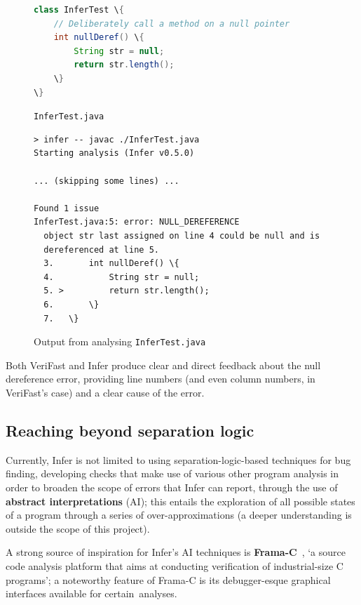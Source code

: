 \begin{figure}
    \centering
    \begin{lstlisting}[language=Java,
        style=code,
        xleftmargin=0.2\textwidth,
        xrightmargin=0.2\textwidth]
class InferTest \{
    // Deliberately call a method on a null pointer
    int nullDeref() \{
        String str = null;
        return str.length();
    \}
\}
    \end{lstlisting}
    \caption{\texttt{InferTest.java}}
    \label{fig:infer-example}
\end{figure}

\begin{figure}
    \centering
    \begin{lstlisting}[style=terminal,
        xleftmargin=0.05\textwidth,
        xrightmargin=0.05\textwidth]
> infer -- javac ./InferTest.java
Starting analysis (Infer v0.5.0)

... (skipping some lines) ...

Found 1 issue
InferTest.java:5: error: NULL_DEREFERENCE
  object str last assigned on line 4 could be null and is
  dereferenced at line 5.
  3.       int nullDeref() \{
  4.           String str = null;
  5. >         return str.length();
  6.       \}
  7.   \}
    \end{lstlisting}
    \caption{Output from analysing \texttt{InferTest.java}}
    \label{fig:infer-example-output}
\end{figure}

Both VeriFast and Infer produce clear and direct feedback about the null
dereference error, providing line numbers (and even column numbers, in
VeriFast's case) and a clear cause of the error.

\subsection{Reaching beyond separation logic}

Currently, Infer is not limited to using separation-logic-based techniques for
bug finding, developing checks that make use of various other program analysis
in order to broaden the scope of errors that Infer can report, through the use
of \textbf{abstract interpretations} (AI); this entails the exploration of all
possible states of a program through a series of over-approximations (a deeper
understanding is outside the scope of this project).

A strong source of inspiration for Infer's AI techniques is
\textbf{Frama-C}~\cite{frama-c-paper, frama-c-site}, `a source code analysis
platform that aims at conducting verification of industrial-size C programs'; a
noteworthy feature of Frama-C is its debugger-esque graphical interfaces
available for certain~analyses.


